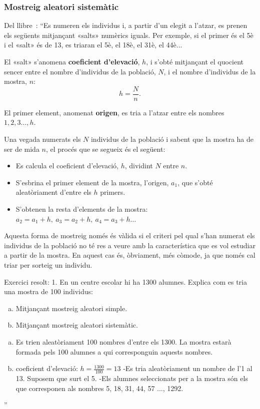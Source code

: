 \subsubsection{Mostreig aleatori sistemàtic}
Del llibre~\cite{Llibre_MACS_II}:
``Es numeren els individus i, a partir d'un elegit a l'atzar, es prenen els següents mitjançant «salts» numèrics iguals. Per exemple, si el primer és el 5è i el «salt» és de 13, es triaran el 5è, el 18è, el 31è, el 44è...

El «salt» s'anomena \textbf{coeficient d'elevació}, $h$, i s'obté mitjançant el quocient sencer entre el nombre d'individus de la població, $N$, i el nombre d'individus de la mostra, $n$:
$$h=\frac{N}{n}.$$

El primer element, anomenat \textbf{origen}, es tria a l'atzar entre els nombres $1, 2, 3\ldots, h$.

Una vegada numerats els $N$ individus de la població i sabent que la mostra ha de ser de mida $n$, el procés que se segueix és el següent:

\begin{itemize}
 \item Es calcula el coeficient d'elevació, $h$, dividint $N$ entre $n$.
 \item S'esbrina el primer element de la mostra, l'origen, $a_1$, que s'obté aleatòriament d'entre els $h$ primers.
 \item S'obtenen la resta d'elements de la mostra: $a_2=a_1+h,\ a_3=a_2+h,\ a_4=a_3+h\ldots$
\end{itemize}

Aquesta forma de mostreig només és vàlida si el criteri pel qual s'han numerat els individus de la població no té res a veure amb la característica que es vol estudiar a partir de la mostra. En aquest cas és, òbviament, més còmode, ja que només cal triar per sorteig un individu.


Exercici resolt:
1. En un centre escolar hi ha 1300 alumnes. Explica com es tria una mostra de 100 individus:
\begin{enumerate}[a)]
 \item Mitjançant mostreig aleatori simple.

 \item Mitjançant mostreig aleatori sistemàtic.
\end{enumerate}

\begin{enumerate}[a)]
 \item Es trien aleatòriament 100 nombres d'entre els 1300. La mostra estarà formada pels 100 alumnes a qui corresponguin aquests nombres.

 \item coeficient d'elevació: $h = \frac{1300}{100} = 13$
    -Es tria aleatòriament un nombre de l'1 al 13. Suposem que surt el 5.
    -Els alumnes seleccionats per a la mostra són els que corresponen als nombres 5, 18, 31, 44, 57 ..., 1292.
\end{enumerate}''


